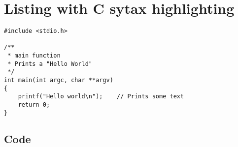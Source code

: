 \section{Listing with C sytax highlighting}
\begin{lstlisting}
#include <stdio.h>

/**
 * main function
 * Prints a "Hello World"
 */
int main(int argc, char **argv)
{
    printf("Hello world\n");    // Prints some text
    return 0;
}
\end{lstlisting}

\subsection{Code}

